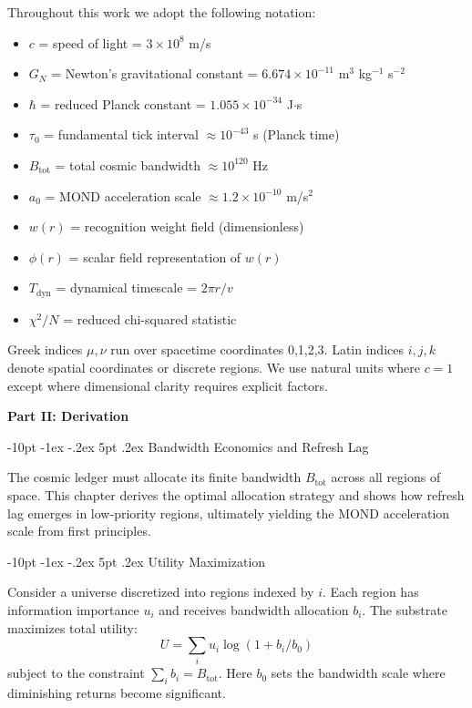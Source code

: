 \documentclass[12pt,letterpaper]{book}
\makeatletter
\renewcommand\section{\@startsection {section}{1}{\z@}%
                {-10pt \@plus -1ex \@minus -.2ex}%
                {5pt \@plus.2ex}%
                {\normalfont\large\bfseries}}
\makeatother
\begin{document}
Throughout this work we adopt the following notation:
\begin{itemize}
\item $c$ = speed of light = $3 \times 10^8$ m/s
\item $G_N$ = Newton's gravitational constant = $6.674 \times 10^{-11}$ m$^3$ kg$^{-1}$ s$^{-2}$
\item $\hbar$ = reduced Planck constant = $1.055 \times 10^{-34}$ J$\cdot$s
\item $\tau_0$ = fundamental tick interval $\approx 10^{-43}$ s (Planck time)
\item $B_{\text{tot}}$ = total cosmic bandwidth $\approx 10^{120}$ Hz
\item $a_0$ = MOND acceleration scale $\approx 1.2 \times 10^{-10}$ m/s$^2$
\item $w(r)$ = recognition weight field (dimensionless)
\item $\phi(r)$ = scalar field representation of $w(r)$
\item $T_{\text{dyn}}$ = dynamical timescale = $2\pi r/v$
\item $\chi^2/N$ = reduced chi-squared statistic
\end{itemize}

Greek indices $\mu, \nu$ run over spacetime coordinates 0,1,2,3. Latin indices $i,j,k$ denote spatial coordinates or discrete regions. We use natural units where $c = 1$ except where dimensional clarity requires explicit factors.

\textbf{Part II: Derivation}
\label{part:derivation}

\section{Bandwidth Economics and Refresh Lag}
\label{chap:bandwidth}

The cosmic ledger must allocate its finite bandwidth $B_{\text{tot}}$ across all regions of space. This chapter derives the optimal allocation strategy and shows how refresh lag emerges in low-priority regions, ultimately yielding the MOND acceleration scale from first principles.

\section{Utility Maximization}

Consider a universe discretized into regions indexed by $i$. Each region has information importance $u_i$ and receives bandwidth allocation $b_i$. The substrate maximizes total utility:
\begin{equation}
U = \sum_i u_i \log(1 + b_i/b_0)
\end{equation}
subject to the constraint $\sum_i b_i = B_{\text{tot}}$. Here $b_0$ sets the bandwidth scale where diminishing returns become significant.
\end{document}
